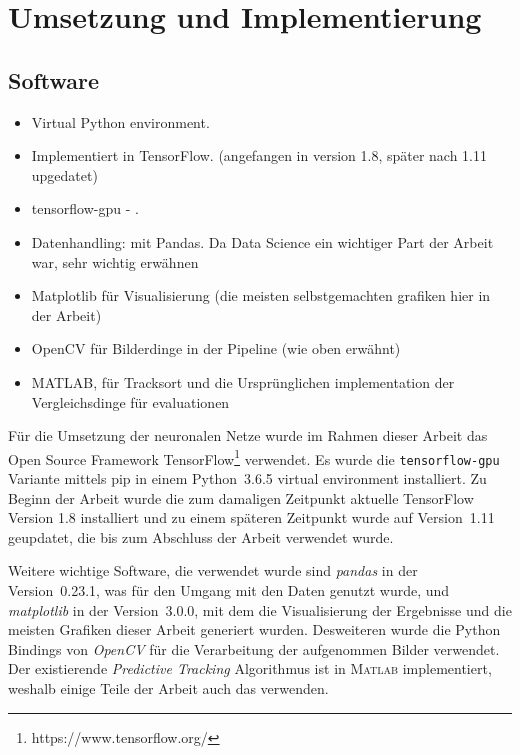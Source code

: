 \chapter{Umsetzung und Implementierung}



\section{Software}

\color{blue}
\begin{itemize}
    \item Virtual Python environment.
    \item Implementiert in TensorFlow. (angefangen in version 1.8, später nach 1.11 upgedatet)
    \item tensorflow-gpu - .
    \item Datenhandling: mit Pandas. Da Data Science ein wichtiger Part der Arbeit war, sehr wichtig erwähnen
    \item Matplotlib für Visualisierung (die meisten selbstgemachten grafiken hier in der Arbeit)
    \item OpenCV für Bilderdinge in der Pipeline (wie oben erwähnt)
    \item MATLAB, für Tracksort und die Ursprünglichen implementation der Vergleichsdinge für evaluationen 
\end{itemize}
\color{black}

Für die Umsetzung der neuronalen Netze wurde im Rahmen dieser Arbeit 
das Open Source Framework TensorFlow\footnote{https://www.tensorflow.org/} verwendet.
Es wurde die \texttt{tensorflow-gpu} Variante mittels pip in einem Python~3.6.5 virtual environment installiert.
Zu Beginn der Arbeit wurde die zum damaligen Zeitpunkt aktuelle TensorFlow Version 1.8 installiert 
und zu einem späteren Zeitpunkt wurde auf Version~1.11 geupdatet, die bis zum Abschluss der Arbeit verwendet wurde.

Weitere wichtige Software, die verwendet wurde 
sind \textit{pandas} in der Version~0.23.1, was für den Umgang mit den Daten genutzt wurde, 
und \textit{matplotlib} in der Version~3.0.0, mit dem die Visualisierung der Ergebnisse und die meisten Grafiken dieser Arbeit generiert wurden.
Desweiteren wurde die Python Bindings von \textit{OpenCV} für die Verarbeitung der aufgenommen Bilder verwendet.
Der existierende \textit{Predictive Tracking} Algorithmus ist in \textsc{Matlab} implementiert, 
weshalb einige Teile der Arbeit auch das verwenden.

